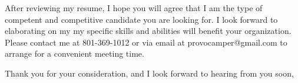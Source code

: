 \documentclass[11pt, a4paper]{awesome-cv}
\begin{document}
\begin{cvletter}
After reviewing my resume, I hope you will agree that I am the type of competent and competitive candidate you are looking for. I look forward to elaborating on my my specific skills and abilities will benefit your organization. Please contact me at 801-369-1012 or via email at provocamper@gmail.com to arrange for a convenient meeting time.

Thank you for your consideration, and I look forward to hearing from you soon,

\end{cvletter}

\makeletterclosing
\end{document}
